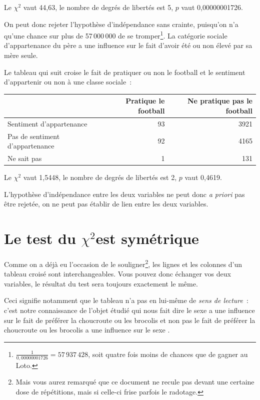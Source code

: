 \documentclass[a4paper,10pt,twoside,francais]{report}
\newcommand{\chid}{$\chi^2$\xspace}
\newcommand{\chidpdf}{\texorpdfstring{$\chi^2$\xspace}{X\texttwosuperior\xspace}}
\begin{document}
Le \chid vaut 44,63, le nombre de degrés de libertés est 5, $p$ vaut
0,00000001726.

On peut donc rejeter l'hypothèse d'indépendance sans crainte,
puisqu'on n'a qu'une chance sur plus de 57\,000\,000 de se
tromper\footnote{$\frac{1}{0,00000001726} = 57\,937\,428$, soit quatre
fois moins de chances que de gagner au Loto.}. La
catégorie sociale d'appartenance du père a une influence sur le fait
d'avoir été ou non élevé par sa mère seule.

Le tableau qui suit croise le fait de pratiquer ou non le football et
le sentiment d'appartenir ou non à une classe sociale~:

\begin{center}
  \begin{tabular}[!h]{lrr}
    \toprule
     & Pratique le football & Ne pratique pas le football\\
    \midrule
    Sentiment d'appartenance & 93 & 3921 \\
    Pas de sentiment d'appartenance & 92 & 4165 \\
    Ne sait pas & 1 & 131 \\ 
    \bottomrule
  \end{tabular}
\end{center}

Le \chid vaut 1,5448, le nombre de degrés de libertés est 2, $p$ vaut
0,4619.

L'hypothèse d'indépendance entre les deux variables ne peut donc \textit{a
priori} pas être rejetée, on ne peut pas établir de lien entre les deux
variables.


\section{Le test du \chidpdf est symétrique}
\label{ssec-sym}

Comme on a déjà eu l'occasion de le souligner\footnote{Mais vous aurez
remarqué que ce document ne recule pas devant une certaine dose de
répétitions, mais si celle-ci frise parfois le radotage.}, les
lignes et les colonnes d'un tableau croisé sont interchangeables. 
Vous pouvez donc échanger vos deux variables, le résultat du test
sera toujours exactement le même.

Ceci signifie notamment que le tableau n'a pas en lui-même de
\textit{sens de lecture}~: c'est notre connaissance de l'objet étudié
qui nous fait dire \og le sexe a une influence sur le fait de préférer
la choucroute ou les brocolis \fg{} et non pas \og le fait de préférer
la choucroute ou les brocolis a une influence sur le sexe \fg{}.
\end{document}
